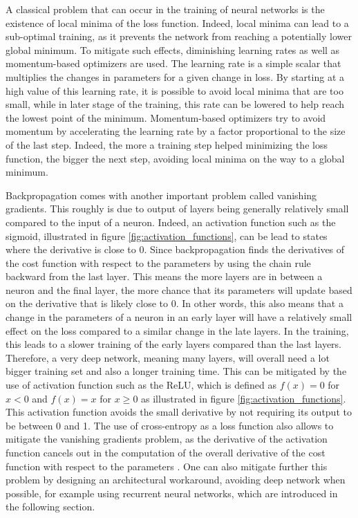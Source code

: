 A classical problem that can occur in the training of neural networks is the existence of local minima of the loss function. Indeed, local minima can lead to a sub-optimal training, as it prevents the network from reaching a potentially lower global minimum. To mitigate such effects, diminishing learning rates as well as momentum-based optimizers are used. The learning rate is a simple scalar that multiplies the changes in parameters for a given change in loss. By starting at a high value of this learning rate, it is possible to avoid local minima that are too small, while in later stage of the training, this rate can be lowered to help reach the lowest point of the minimum. Momentum-based optimizers try to avoid momentum by accelerating the learning rate by a factor proportional to the size of the last step. Indeed, the more a training step helped minimizing the loss function, the bigger the next step, avoiding local minima on the way to a global minimum.

Backpropagation comes with another important problem called vanishing gradients. This roughly is due to output of layers being generally relatively small compared to the input of a neuron. Indeed, an activation function such as the sigmoid, illustrated in figure \ref{fig:activation_functions}, can be lead to states where the derivative is close to 0. Since backpropagation finds the derivatives of the cost function with respect to the parameters by using the chain rule backward from the last layer. This means the more layers are in between a neuron and the final layer, the more chance that its parameters will update based on the derivative that is likely close to 0. In other words, this also means that a change in the parameters of a neuron in an early layer will have a relatively small effect on the loss compared to a similar change in the late layers. In the training, this leads to a slower training of the early layers compared than the last layers. Therefore, a very deep network, meaning many layers, will overall need a lot bigger training set and also a longer training time. This can be mitigated by the use of activation function such as the ReLU, which is defined as $f(x)=0$ for $x < 0$ and $f(x)=x$ for $x \geq 0$ as illustrated in figure \ref{fig:activation_functions}. This activation function avoids the small derivative by not requiring its output to be between 0 and 1. The use of cross-entropy as a loss function also allows to mitigate the vanishing gradients problem, as the derivative of the activation function cancels out in the computation of the overall derivative of the cost function with respect to the parameters \cite{NN_book}. One can also mitigate further this problem by designing an architectural workaround, avoiding deep network when possible, for example using recurrent neural networks, which are introduced in the following section.

